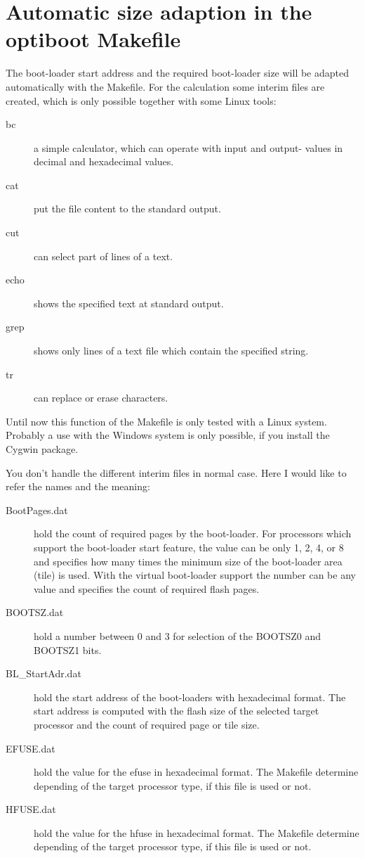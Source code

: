 \section{Automatic size adaption in the optiboot Makefile}

The boot-loader start address and the required boot-loader size will
be adapted automatically with the Makefile.
For the calculation some interim files are created,
which is only possible together with some Linux tools:

\begin{description}
\item [bc] a simple calculator, which can operate with input and output-
values in decimal and hexadecimal values.
\item [cat] put the file content to the standard output.
\item [cut] can select part of lines of a text.
\item [echo] shows the specified text at standard output.
\item [grep] shows only lines of a text file which contain the specified string.
\item [tr] can replace or erase characters.
\end{description}

Until now this function of the Makefile is only tested with a Linux system.
Probably a use with the Windows system is only possible,
if you install the Cygwin package.

You don't handle the different interim files in normal case.
Here I would like to refer the names and the meaning:
\begin{description}
\item [BootPages.dat] hold the count of required pages by the boot-loader.
For processors which support the boot-loader start feature, the value can be only 1, 2, 4, or 8 and
specifies how many times the minimum size of the boot-loader area (tile) is used.
With the virtual boot-loader support the number can be any value and
specifies the count of required flash pages.
\item [BOOTSZ.dat] hold a number between 0 and 3 for selection of the  BOOTSZ0 and BOOTSZ1 bits.
\item [BL\_StartAdr.dat] hold the start address of the boot-loaders with hexadecimal format.
The start address is computed with the flash size of the selected target processor and
the count of required page or tile size.
\item [EFUSE.dat] hold the value for the efuse in hexadecimal format.
The Makefile determine depending of the target processor type,
if this file is used or not.
\item [HFUSE.dat] hold the value for the hfuse in hexadecimal format.
The Makefile determine depending of the target processor type,
if this file is used or not.
\end{description}

